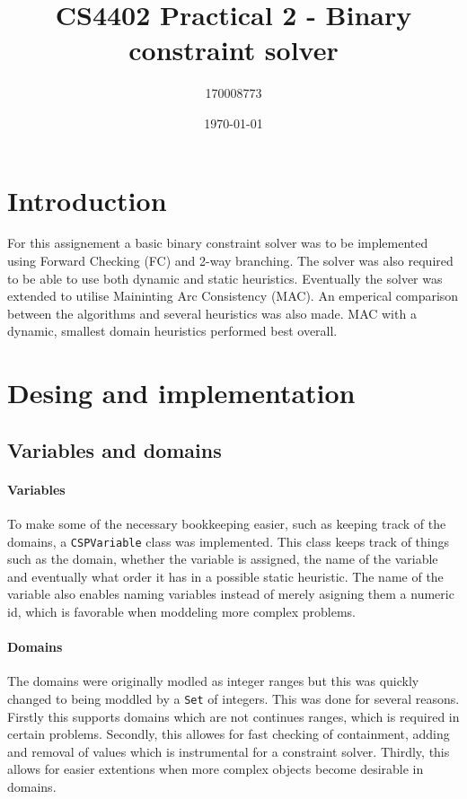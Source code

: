 \documentclass[british]{article}
\title{CS4402 Practical 2 - Binary constraint solver}
\author{170008773}
\date{\today}
\newcommand{\code}[1]{\texttt{#1}}
\begin{document}
\maketitle

\section{Introduction}
For this assignement a basic binary constraint solver was to be implemented using Forward Checking (FC) and 2-way branching. The solver was also required to be able to use both dynamic and static heuristics.  Eventually the solver was extended to utilise Maininting Arc Consistency (MAC). An emperical comparison between the algorithms and several heuristics was also made. MAC with a dynamic, smallest domain heuristics performed best overall. 


\section{Desing and implementation}
\subsection{Variables and domains}
\paragraph{Variables}To make some of the necessary bookkeeping easier, such as keeping track of the domains, a \code{CSPVariable} class was implemented. This class keeps track of things such as the domain, whether the variable is assigned, the name of the variable and eventually what order it has in a possible static heuristic. The name of the variable also enables naming variables instead of merely asigning them a numeric id, which is favorable when moddeling more complex problems. 

\paragraph{Domains} The domains were originally modled as integer ranges but this was quickly changed to being moddled by a \code{Set} of integers. This was done for several reasons. Firstly this supports domains which are not continues ranges, which is required in certain problems. Secondly, this allowes for fast checking of containment, adding and removal of values which is instrumental for a constraint solver. Thirdly, this allows for easier extentions when more complex objects become desirable in domains. 
\end{document}
